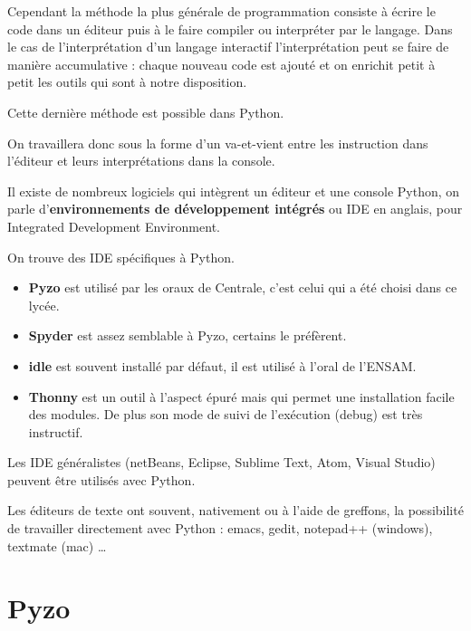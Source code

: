 \medskip

Cependant la méthode la plus générale de programmation consiste à écrire le code dans un éditeur puis à le faire compiler  ou interpréter par le langage. Dans le cas de l'interprétation d'un langage interactif l'interprétation peut se faire de manière accumulative : chaque nouveau code est ajouté et on enrichit petit à petit les outils qui sont à notre disposition. 

Cette dernière méthode est possible dans Python.

On travaillera donc sous la forme d'un va-et-vient entre les instruction dans l'éditeur et leurs interprétations dans la console.

Il existe de nombreux logiciels qui intègrent un éditeur et une console Python, on parle d'{\bf environnements de développement intégrés} ou IDE en anglais, pour Integrated Development Environment.

On trouve des IDE spécifiques à Python.
\begin{itemize}
\item {\bf Pyzo} est utilisé par les oraux de Centrale, c'est celui qui a été choisi dans ce lycée.
\item {\bf Spyder} est assez semblable à Pyzo, certains le préfèrent.
\item {\bf idle} est souvent installé par défaut, il est utilisé à l'oral de l'ENSAM.
\item {\bf Thonny} est un outil à l'aspect épuré mais qui permet une installation facile des modules. De plus son mode de suivi de l'exécution (debug) est très instructif.
\end{itemize}

Les IDE généralistes (netBeans, Eclipse, Sublime Text, Atom, Visual Studio) peuvent être utilisés avec Python.

Les éditeurs de texte ont souvent, nativement ou à l'aide de greffons, la possibilité de travailler directement avec Python : emacs, gedit, notepad++ (windows), textmate (mac) \dots
\section{Pyzo}
